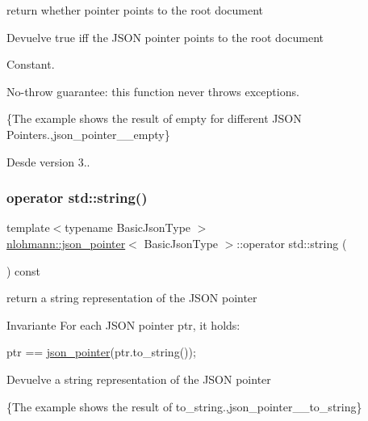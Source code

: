 return whether pointer points to the root document 

\begin{DoxyReturn}{Devuelve}
true iff the J\+S\+ON pointer points to the root document
\end{DoxyReturn}
Constant.

No-\/throw guarantee\+: this function never throws exceptions.

\{The example shows the result of {\ttfamily empty} for different J\+S\+ON Pointers.,json\+\_\+pointer\+\_\+\+\_\+empty\}

\begin{DoxySince}{Desde}
version 3.. 
\end{DoxySince}
\mbox{\label{classnlohmann_1_1json__pointer_ae9015c658f99cf3d48a8563accc79988}} 
\subsubsection{\texorpdfstring{operator std\+::string()}{operator std::string()}}
{\footnotesize\ttfamily template$<$typename Basic\+Json\+Type $>$ \\
\mbox{\hyperlink{classnlohmann_1_1json__pointer}{nlohmann\+::json\+\_\+pointer}}$<$ Basic\+Json\+Type $>$\+::operator std\+::string (\begin{DoxyParamCaption}{ }\end{DoxyParamCaption}) const\hspace{0.3cm}{\ttfamily [inline]}}



return a string representation of the J\+S\+ON pointer 

\begin{DoxyInvariant}{Invariante}
For each J\+S\+ON pointer {\ttfamily ptr}, it holds\+: 
\begin{DoxyCode}
ptr == \mbox{\hyperlink{classnlohmann_1_1json__pointer_a7f32d7c62841f0c4a6784cf741a6e4f8}{json\_pointer}}(ptr.to\_string());
\end{DoxyCode}

\end{DoxyInvariant}
\begin{DoxyReturn}{Devuelve}
a string representation of the J\+S\+ON pointer
\end{DoxyReturn}
\{The example shows the result of {\ttfamily to\+\_\+string}.,json\+\_\+pointer\+\_\+\+\_\+to\+\_\+string\}

